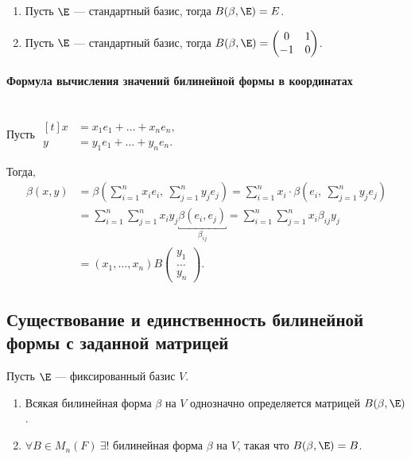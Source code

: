 \begin{enumerate}
\item Пусть $\E$ --- стандартный базис, тогда $B(\beta, \E) = E$.
\item Пусть $\E$ --- стандартный базис, тогда $B(\beta, \E) = \begin{pmatrix} 0 & 1 \\ -1 & 0 \end{pmatrix}$.
\end{enumerate}

\paragraph{Формула вычисления значений билинейной формы в координатах}~\\

Пусть
\begin{math}
    \begin{aligned}[t]
        x &= x_1 e_1 + \dots + x_n e_n, \\
        y &= y_1 e_1 + \dots + y_n e_n.
    \end{aligned}
\end{math}

Тогда,
\begin{align*}
    \beta(x, y)
    &= \beta\left(\sum_{i = 1}^{n} x_i e_i, \ \sum_{j = 1}^{n} y_j e_j\right)
    = \sum_{i = 1}^{n} x_i \cdot \beta\left(e_i, \ \sum_{j = 1}^{n} y_j e_j\right) \\
    &= \sum_{i = 1}^{n} \sum_{j = 1}^{n} x_i y_j \underbracket{\beta(e_i, e_j)}_{\beta_{ij}}
    = \sum_{i = 1}^{n} \sum_{j = 1}^{n} x_i \beta_{ij} y_j  \\
    &= (x_1, \dots, x_n) B \begin{pmatrix} y_1 \\ \dots \\ y_n \end{pmatrix}
.\end{align*}


\subsection{Существование и единственность билинейной формы с заданной матрицей}

\begin{proposal}
    Пусть $\E$ --- фиксированный базис $V$.
    \begin{enumerate}
    \item Всякая билинейная форма $\beta$ на $V$ однозначно определяется матрицей $B(\beta, \E)$.
    \item $\forall B \in M_n(F) \ \exists!$ билинейная форма $\beta$ на $V$, такая что $B(\beta, \E) = B$.
    \end{enumerate}
\end{proposal}

